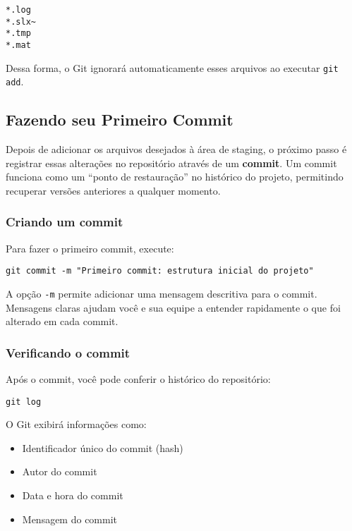 \begin{lstlisting}[style=shellstyle]
*.log
*.slx~
*.tmp
*.mat
\end{lstlisting}

Dessa forma, o Git ignorará automaticamente esses arquivos ao executar \texttt{git add}.

\subsection{Fazendo seu Primeiro Commit}

Depois de adicionar os arquivos desejados à área de staging, o próximo passo é registrar essas alterações no repositório através de um \textbf{commit}. Um commit funciona como um “ponto de restauração” no histórico do projeto, permitindo recuperar versões anteriores a qualquer momento.

\subsubsection*{Criando um commit}

Para fazer o primeiro commit, execute:

\begin{lstlisting}[style=shellstyle]
git commit -m "Primeiro commit: estrutura inicial do projeto"
\end{lstlisting}

\noindent
A opção \texttt{-m} permite adicionar uma mensagem descritiva para o commit. Mensagens claras ajudam você e sua equipe a entender rapidamente o que foi alterado em cada commit.

\subsubsection*{Verificando o commit}

Após o commit, você pode conferir o histórico do repositório:

\begin{lstlisting}[style=shellstyle]
git log
\end{lstlisting}

O Git exibirá informações como:
\begin{itemize}
    \item Identificador único do commit (hash)  
    \item Autor do commit  
    \item Data e hora do commit  
    \item Mensagem do commit
\end{itemize}